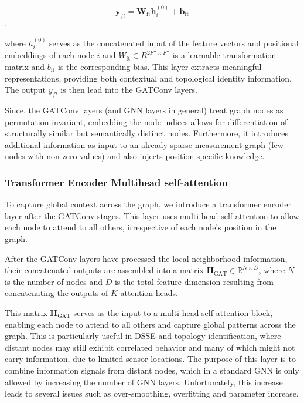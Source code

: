 \documentclass[journal]{IEEEtran}  %
\begin{document}
\begin{equation}
\label{eq:Feature FC layer}
\mathbf{y}_{ft} = \mathbf{W}_{\text{ft}} \mathbf{h}_i^{(0)} + \mathbf{b}_{\text{ft}}
\end{equation},

where ${h}_{i}^{(0)}$ serves as the concatenated input of the feature vectors and positional embeddings of each node $i$ and ${W}_{\text{ft}} \in {R}^{2F'' \times F''}$ is a learnable transformation matrix and ${b}_{\text{ft}}$ is the corresponding bias. This layer extracts meaningful representations, providing both contextual and topological identity information. The output ${y}_{ft}$ is then lead into the GATConv layers.

Since, the GATConv layers (and GNN layers in general) treat graph nodes as permutation invariant, embedding the node indices allows for differentiation of structurally similar but semantically distinct nodes. Furthermore, it introduces additional information as input to an already sparse measurement graph (few nodes with non-zero values) and also injects position-specific knowledge.

\subsubsection{Transformer Encoder Multihead self-attention}

To capture global context across the graph, we introduce a transformer encoder layer after the GATConv stages. This layer uses multi-head self-attention to allow each node to attend to all others, irrespective of each node's position in the graph.

After the GATConv layers have processed the local neighborhood information, their concatenated outputs are assembled into a matrix \( \mathbf{H}_{\text{GAT}} \in \mathbb{R}^{N \times D} \), where \( N \) is the number of nodes and \( D \) is the total feature dimension resulting from concatenating the outputs of \( K \) attention heads.

This matrix \( \mathbf{H}_{\text{GAT}} \) serves as the input to a multi-head self-attention block, enabling each node to attend to all others and capture global patterns across the graph. This is particularly useful in DSSE and topology identification, where distant nodes may still exhibit correlated behavior and many of which might not carry information, due to limited sensor locations. The purpose of this layer is to combine information signals from distant nodes, which in a standard GNN is only allowed by increasing the number of GNN layers. Unfortunately, this increase leads to several issues such as over-smoothing, overfitting and parameter increase.
\end{document}
